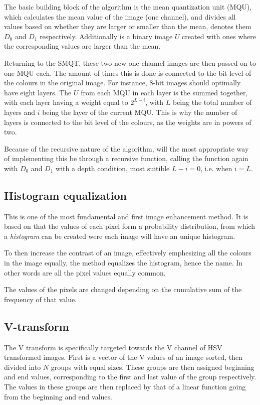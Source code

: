 \documentclass{IEEEtran}
\begin{document}
The basic building block of the algorithm is the mean quantization unit (MQU), which calculates the mean value of the image (one channel), and divides all values based on whether they are larger or smaller than the mean, \cite{smqt_2008} denotes them $D_0$ and $D_1$ respectively. Additionally is a binary image $U$ created with ones where the corresponding values are larger than the mean.

Returning to the SMQT, these two new one channel images are then passed on to one MQU each. The amount of times this is done is connected to the bit-level of the colours in the original image. For instance, 8-bit images should optimally have eight layers. The $U$ from each MQU in each layer is the summed together, with each layer having a weight equal to $2^{L-i}$, with $L$ being the total number of layers and $i$ being the layer of the current MQU. This is why the number of layers is connected to the bit level of the colours, as the weights are in powers of two.

Because of the recursive nature of the algorithm, will the most appropriate way of implementing this be through a recursive function, calling the function again with $D_0$ and $D_1$ with a depth condition, most suitible $L-i = 0$, i.e. when $i = L$.
\subsection{Histogram equalization}

This is one of the most fundamental and first image enhancement method. It is based on that the values of each pixel form a probability distribution, from which a \emph{histogram} can be created were each image will have an unique histogram.

To then increase the contrast of an image, effectively emphesizing all the colours in the image equally, the method equalizes the histogram, hence the name. In other words are all the pixel values equally common.

The values of the pixels are changed depending on the cumulative sum of the frequency of that value.
\subsection{V-transform}

The V transform is specifically targeted towards the V channel of HSV transformed images. First is a vector of the V values of an image sorted, then divided into $N$ groups with equal sizes. These groups are then assigned beginning and end values, corresponding to the first and last value of the group respectively. The values in these groups are then replaced by that of a linear function going from the beginning and end values.
\end{document}
